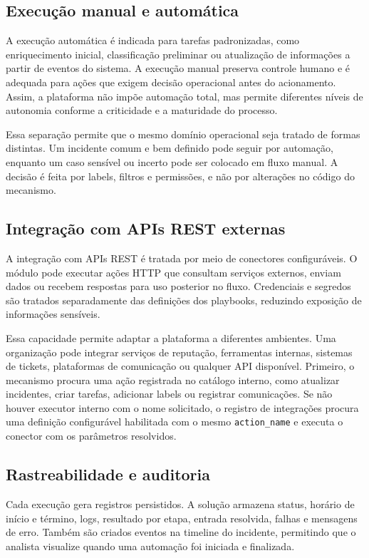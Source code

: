 \documentclass[article,a4paper,12pt,english,brazil,sumario=tradicional]{abntex2}
\begin{document}
\subsection{Execução manual e automática}

A execução automática é indicada para tarefas padronizadas, como enriquecimento inicial, classificação preliminar ou atualização de informações a partir de eventos do sistema. A execução manual preserva controle humano e é adequada para ações que exigem decisão operacional antes do acionamento. Assim, a plataforma não impõe automação total, mas permite diferentes níveis de autonomia conforme a criticidade e a maturidade do processo.

Essa separação permite que o mesmo domínio operacional seja tratado de formas distintas. Um incidente comum e bem definido pode seguir por automação, enquanto um caso sensível ou incerto pode ser colocado em fluxo manual. A decisão é feita por labels, filtros e permissões, e não por alterações no código do mecanismo.

\subsection{Integração com APIs REST externas}

A integração com APIs REST é tratada por meio de conectores configuráveis. O módulo pode executar ações HTTP que consultam serviços externos, enviam dados ou recebem respostas para uso posterior no fluxo. Credenciais e segredos são tratados separadamente das definições dos playbooks, reduzindo exposição de informações sensíveis.

Essa capacidade permite adaptar a plataforma a diferentes ambientes. Uma organização pode integrar serviços de reputação, ferramentas internas, sistemas de tickets, plataformas de comunicação ou qualquer API disponível. Primeiro, o mecanismo procura uma ação registrada no catálogo interno, como atualizar incidentes, criar tarefas, adicionar labels ou registrar comunicações. Se não houver executor interno com o nome solicitado, o registro de integrações procura uma definição configurável habilitada com o mesmo \texttt{action\_name} e executa o conector com os parâmetros resolvidos.

\subsection{Rastreabilidade e auditoria}

Cada execução gera registros persistidos. A solução armazena status, horário de início e término, logs, resultado por etapa, entrada resolvida, falhas e mensagens de erro. Também são criados eventos na timeline do incidente, permitindo que o analista visualize quando uma automação foi iniciada e finalizada.
\end{document}

